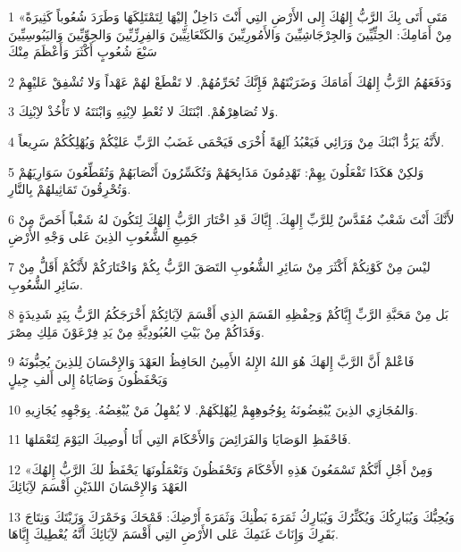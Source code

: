\par 1 «مَتَى أَتَى بِكَ الرَّبُّ إِلهُكَ إِلى الأَرْضِ التِي أَنْتَ دَاخِلٌ إِليْهَا لِتَمْتَلِكَهَا وَطَرَدَ شُعُوباً كَثِيرَةً مِنْ أَمَامِكَ: الحِثِّيِّينَ وَالجِرْجَاشِيِّينَ وَالأَمُورِيِّينَ وَالكَنْعَانِيِّينَ وَالفِرِزِّيِّينَ وَالحِوِّيِّينَ وَاليَبُوسِيِّينَ سَبْعَ شُعُوبٍ أَكْثَرَ وَأَعْظَمَ مِنْكَ
\par 2 وَدَفَعَهُمُ الرَّبُّ إِلهُكَ أَمَامَكَ وَضَرَبْتَهُمْ فَإِنَّكَ تُحَرِّمُهُمْ. لا تَقْطَعْ لهُمْ عَهْداً وَلا تُشْفِقْ عَليْهِمْ
\par 3 وَلا تُصَاهِرْهُمْ. ابْنَتَكَ لا تُعْطِ لاِبْنِهِ وَابْنَتَهُ لا تَأْخُذْ لاِبْنِكَ.
\par 4 لأَنَّهُ يَرُدُّ ابْنَكَ مِنْ وَرَائِي فَيَعْبُدُ آلِهَةً أُخْرَى فَيَحْمَى غَضَبُ الرَّبِّ عَليْكُمْ وَيُهْلِكُكُمْ سَرِيعاً.
\par 5 وَلكِنْ هَكَذَا تَفْعَلُونَ بِهِمْ: تَهْدِمُونَ مَذَابِحَهُمْ وَتُكَسِّرُونَ أَنْصَابَهُمْ وَتُقَطِّعُونَ سَوَارِيَهُمْ وَتُحْرِقُونَ تَمَاثِيلهُمْ بِالنَّارِ.
\par 6 لأَنَّكَ أَنْتَ شَعْبٌ مُقَدَّسٌ لِلرَّبِّ إِلهِكَ. إِيَّاكَ قَدِ اخْتَارَ الرَّبُّ إِلهُكَ لِتَكُونَ لهُ شَعْباً أَخَصَّ مِنْ جَمِيعِ الشُّعُوبِ الذِينَ عَلى وَجْهِ الأَرْضِ
\par 7 ليْسَ مِنْ كَوْنِكُمْ أَكْثَرَ مِنْ سَائِرِ الشُّعُوبِ التَصَقَ الرَّبُّ بِكُمْ وَاخْتَارَكُمْ لأَنَّكُمْ أَقَلُّ مِنْ سَائِرِ الشُّعُوبِ.
\par 8 بَل مِنْ مَحَبَّةِ الرَّبِّ إِيَّاكُمْ وَحِفْظِهِ القَسَمَ الذِي أَقْسَمَ لآِبَائِكُمْ أَخْرَجَكُمُ الرَّبُّ بِيَدٍ شَدِيدَةٍ وَفَدَاكُمْ مِنْ بَيْتِ العُبُودِيَّةِ مِنْ يَدِ فِرْعَوْنَ مَلِكِ مِصْرَ.
\par 9 فَاعْلمْ أَنَّ الرَّبَّ إِلهَكَ هُوَ اللهُ الإِلهُ الأَمِينُ الحَافِظُ العَهْدَ وَالإِحْسَانَ لِلذِينَ يُحِبُّونَهُ وَيَحْفَظُونَ وَصَايَاهُ إِلى أَلفِ جِيلٍ
\par 10 وَالمُجَازِي الذِينَ يُبْغِضُونَهُ بِوُجُوهِهِمْ لِيُهْلِكَهُمْ. لا يُمْهِلُ مَنْ يُبْغِضُهُ. بِوَجْهِهِ يُجَازِيهِ.
\par 11 فَاحْفَظِ الوَصَايَا وَالفَرَائِضَ وَالأَحْكَامَ التِي أَنَا أُوصِيكَ اليَوْمَ لِتَعْمَلهَا.
\par 12 «وَمِنْ أَجْلِ أَنَّكُمْ تَسْمَعُونَ هَذِهِ الأَحْكَامَ وَتَحْفَظُونَ وَتَعْمَلُونَهَا يَحْفَظُ لكَ الرَّبُّ إِلهُكَ العَهْدَ وَالإِحْسَانَ اللذَيْنِ أَقْسَمَ لآِبَائِكَ
\par 13 وَيُحِبُّكَ وَيُبَارِكُكَ وَيُكَثِّرُكَ وَيُبَارِكُ ثَمَرَةَ بَطْنِكَ وَثَمَرَةَ أَرْضِكَ: قَمْحَكَ وَخَمْرَكَ وَزَيْتَكَ وَنِتَاجَ بَقَرِكَ وَإِنَاثَ غَنَمِكَ عَلى الأَرْضِ التِي أَقْسَمَ لآِبَائِكَ أَنَّهُ يُعْطِيكَ إِيَّاهَا.
